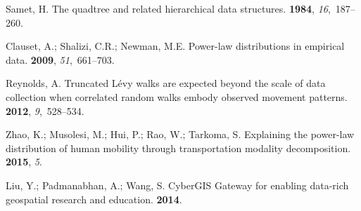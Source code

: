 \documentclass[ijgi,article,accept,moreauthors,pdftex,10pt,a4paper]{mdpi}
\theoremstyle{mdpi}
\newcounter{ex}
\newcounter{re}
\theoremstyle{mdpidefinition}
\begin{document}
\begin{thebibliography}{-------}
Samet, H.
\newblock The quadtree and related hierarchical data structures.
 {\bf 1984}, {\em 16},~187--260.

Clauset, A.; Shalizi, C.R.; Newman, M.E.
\newblock Power-law distributions in empirical data.
 {\bf 2009}, {\em 51},~661--703.

Reynolds, A.
\newblock Truncated L{\'e}vy walks are expected beyond the scale of data
  collection when correlated random walks embody observed movement patterns.
 {\bf 2012}, {\em
  9},~528--534.

Zhao, K.; Musolesi, M.; Hui, P.; Rao, W.; Tarkoma, S.
\newblock Explaining the power-law distribution of human mobility through
  transportation modality decomposition.
 {\bf 2015}, {\em 5}.

Liu, Y.; Padmanabhan, A.; Wang, S.
\newblock CyberGIS Gateway for enabling data-rich geospatial research and
  education.
 {\bf
  2014}.

\end{thebibliography}
\end{document}
